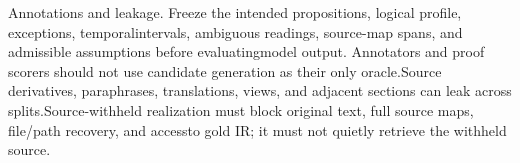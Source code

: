 \noindent
Annotations and leakage. Freeze the intended propositions, logical profile, exceptions, temporal\linebreak[4]
intervals, ambiguous readings, source-map spans, and admissible assumptions before evaluating\linebreak[4]
model output. Annotators and proof scorers should not use candidate generation as their only oracle.\linebreak[4]
Source derivatives, paraphrases, translations, views, and adjacent sections can leak across splits.\linebreak[4]
Source-withheld realization must block original text, full source maps, file/path recovery, and access\linebreak[4]
to gold IR; it must not quietly retrieve the withheld source.\par


